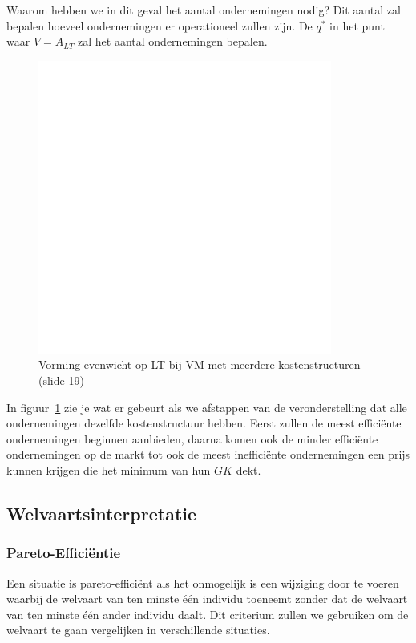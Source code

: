 Waarom hebben we in dit geval het aantal ondernemingen nodig? Dit aantal zal bepalen hoeveel ondernemingen er operationeel zullen zijn. De $q^*$ in het punt waar $V = A_{LT}$ zal het aantal ondernemingen bepalen.

\begin{figure}[htbp]
   \centering
   \includegraphics[scale=0.4]{Images/white.png}
   \caption{Vorming evenwicht op LT bij VM met meerdere kostenstructuren (slide 19)}
   \label{fig:evenwichtLTVMmeerdere}
\end{figure}

In figuur~\ref{fig:evenwichtLTVMmeerdere} zie je wat er gebeurt als we afstappen van de veronderstelling dat alle ondernemingen dezelfde kostenstructuur hebben. Eerst zullen de meest effici\"ente ondernemingen beginnen aanbieden, daarna komen ook de minder effici\"ente ondernemingen op de markt tot ook de meest ineffici\"ente ondernemingen een prijs kunnen krijgen die het minimum van hun $GK$ dekt.

\subsection{Welvaartsinterpretatie}
\subsubsection{Pareto-Effici\"entie}
\label{sssec:paretoefficientie}
Een situatie is pareto-effici\"ent als het onmogelijk is een wijziging door te voeren waarbij de welvaart van ten minste \'e\'en individu toeneemt zonder dat de welvaart van ten minste \'e\'en ander individu daalt. Dit criterium zullen we gebruiken om de welvaart te gaan vergelijken in verschillende situaties.

